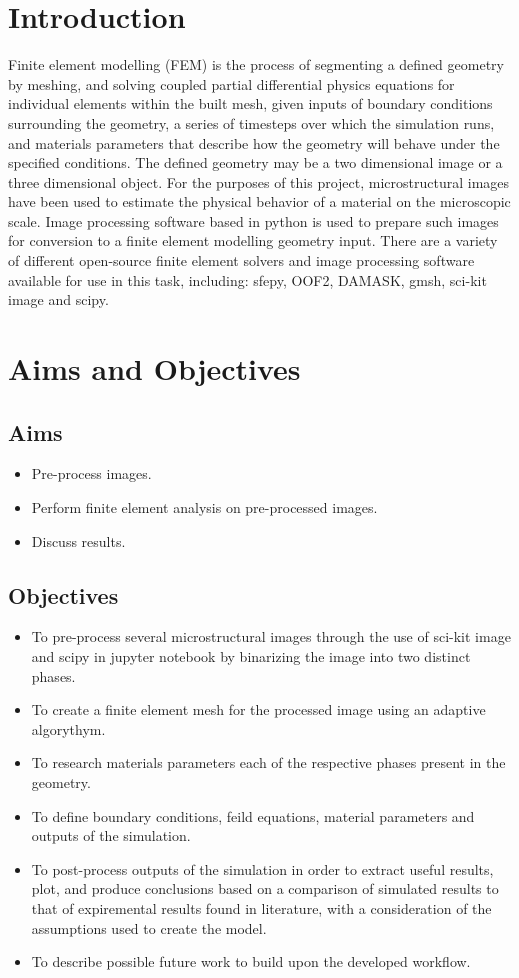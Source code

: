\documentclass[\report.tex]{subfiles}
\begin{document}
\section{Introduction}
Finite element modelling (FEM) is the process of segmenting a defined geometry by meshing, and solving coupled partial differential physics equations for individual elements within the built mesh, given inputs of boundary conditions surrounding the geometry, a series of timesteps over which the simulation runs, and materials parameters that describe how the geometry will behave under the specified conditions. The defined geometry may be a two dimensional image or a three dimensional object. For the purposes of this project, microstructural images have been used to estimate the physical behavior of a material on the microscopic scale. Image processing software based in python is used to prepare such images for conversion to a finite element modelling geometry input. There are a variety of different open-source finite element solvers and image processing software available for use in this task, including: sfepy, OOF2, DAMASK, gmsh, sci-kit image and scipy.

\section{Aims and Objectives}
\subsection{Aims}

\begin{itemize}
  \item Pre-process images.
  \item Perform finite element analysis on pre-processed images.
  \item Discuss results.
\end{itemize}

\subsection{Objectives}

\begin{itemize}
  \item To pre-process several microstructural images through the use of sci-kit image and scipy in jupyter notebook by binarizing the image into two distinct phases.
  \item To create a finite element mesh for the processed image using an adaptive algorythym.
  \item To research materials parameters each of the respective phases present in the geometry.
  \item To define boundary conditions, feild equations, material parameters and outputs of the simulation.
  \item To post-process outputs of the simulation in order to extract useful results, plot, and produce conclusions based on a comparison of simulated results to that of expiremental results found in literature, with a consideration of the assumptions used to create the model.
  \item To describe possible future work to build upon the developed workflow.
\end{itemize}
\end{document}
